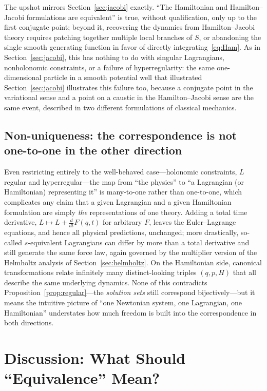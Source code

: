\documentclass[11pt]{article}
\begin{document}
The upshot mirrors Section~\ref{sec:jacobi} exactly. ``The Hamiltonian and Hamilton--Jacobi formulations are equivalent'' is true, without qualification, only up to the first conjugate point; beyond it, recovering the dynamics from Hamilton--Jacobi theory requires patching together multiple local branches of $S$, or abandoning the single smooth generating function in favor of directly integrating~\eqref{eq:Ham}. As in Section~\ref{sec:jacobi}, this has nothing to do with singular Lagrangians, nonholonomic constraints, or a failure of hyperregularity: the same one-dimensional particle in a smooth potential well that illustrated Section~\ref{sec:jacobi} illustrates this failure too, because a conjugate point in the variational sense and a point on a caustic in the Hamilton--Jacobi sense are the same event, described in two different formulations of classical mechanics.

\subsection{Non-uniqueness: the correspondence is not one-to-one in the other direction}
\label{sec:nonunique}

Even restricting entirely to the well-behaved case---holonomic constraints, $L$ regular and hyperregular---the map from ``the physics'' to ``a Lagrangian (or Hamiltonian) representing it'' is many-to-one rather than one-to-one, which complicates any claim that a given Lagrangian and a given Hamiltonian formulation are simply \emph{the} representations of one theory. Adding a total time derivative, $L \mapsto L + \frac{d}{dt}F(q,t)$ for arbitrary $F$, leaves the Euler--Lagrange equations, and hence all physical predictions, unchanged; more drastically, so-called $s$-equivalent Lagrangians can differ by more than a total derivative and still generate the same force law, again governed by the multiplier version of the Helmholtz analysis of Section~\ref{sec:helmholtz}. On the Hamiltonian side, canonical transformations relate infinitely many distinct-looking triples $(q,p,H)$ that all describe the same underlying dynamics. None of this contradicts Proposition~\ref{prop:regular}---the \emph{solution sets} still correspond bijectively---but it means the intuitive picture of ``one Newtonian system, one Lagrangian, one Hamiltonian'' understates how much freedom is built into the correspondence in both directions.

\section{Discussion: What Should ``Equivalence'' Mean?}
\label{sec:discussion}
\end{document}
